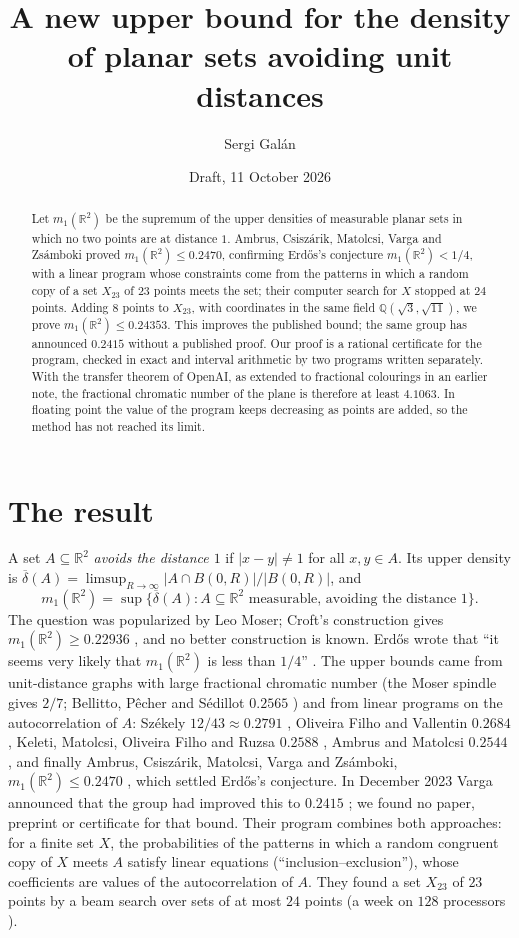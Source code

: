 \documentclass[11pt,a4paper]{amsart}
\title{A new upper bound for the density of planar sets avoiding unit distances}
\author{Sergi Gal\'an}
\date{Draft, 11 October 2026}
\theoremstyle{remark}
\newcommand{\Q}{\mathbb{Q}}
\newcommand{\R}{\mathbb{R}}
\newcommand{\NNEW}{8}
\newcommand{\MONE}{0.24353}
\newcommand{\INVM}{4.1063}
\begin{document}
\begin{abstract}
Let $m_1(\R^2)$ be the supremum of the upper densities of measurable planar sets in which no two points are at
distance $1$. Ambrus, Csisz\'arik, Matolcsi, Varga and Zs\'amboki proved $m_1(\R^2)\le0.2470$, confirming Erd\H{o}s's
conjecture $m_1(\R^2)<1/4$, with a linear program whose constraints come from the patterns in which a random copy of a
set $X_{23}$ of $23$ points meets the set; their computer search for $X$ stopped at $24$ points. Adding $\NNEW$ points
to $X_{23}$, with coordinates in the same field $\Q(\sqrt3,\sqrt{11})$, we prove $m_1(\R^2)\le\MONE$. This improves the published bound; the same group has announced $0.2415$ without a
published proof. Our proof is a rational certificate for the program, checked in exact and interval arithmetic by two
programs written separately.
With the transfer theorem of OpenAI, as extended to fractional colourings in an earlier note, the fractional chromatic
number of the plane is therefore at least $\INVM$. In floating point the value of the program keeps decreasing as points
are added, so the method has not reached its limit.
\end{abstract}

\maketitle

\section{The result}

A set $A\subseteq\R^2$ \emph{avoids the distance $1$} if $|x-y|\ne1$ for all $x,y\in A$. Its upper density is
$\overline\delta(A)=\limsup_{R\to\infty}|A\cap B(0,R)|/|B(0,R)|$, and
\[
m_1(\R^2)=\sup\{\overline\delta(A):A\subseteq\R^2\text{ measurable, avoiding the distance }1\}.
\]
The question was popularized by Leo Moser; Croft's construction gives $m_1(\R^2)\ge0.22936$ \cite{Croft}, and no better
construction is known. Erd\H{o}s wrote that ``it seems very likely that $m_1(\R^2)$ is less than $1/4$''
\cite{Erdos85}. The upper bounds came from unit-distance graphs with large fractional chromatic number (the Moser spindle
gives $2/7$; Bellitto, P\^echer and S\'edillot $0.2565$ \cite{BPS}) and from linear programs on the autocorrelation of
$A$: Sz\'ekely $12/43\approx0.2791$ \cite{Szekely}, Oliveira Filho and Vallentin $0.2684$ \cite{OFV}, Keleti, Matolcsi,
Oliveira Filho and Ruzsa $0.2588$ \cite{KMOR}, Ambrus and Matolcsi $0.2544$ \cite{AM}, and finally Ambrus,
Csisz\'arik, Matolcsi, Varga and Zs\'amboki, $m_1(\R^2)\le0.2470$ \cite{ACMVZ}, which settled Erd\H{o}s's conjecture.
In December 2023 Varga announced that the group had improved this to $0.2415$ \cite{Varga}; we found no paper, preprint
or certificate for that bound.
Their program combines both approaches: for a finite set $X$, the probabilities of the patterns in which a random
congruent copy of $X$ meets $A$ satisfy linear equations (``inclusion--exclusion''), whose coefficients are values of
the autocorrelation of $A$. They found a set $X_{23}$ of $23$ points by a beam search over sets of at most $24$ points
(a week on $128$ processors \cite[§9]{ACMVZ}).
\end{document}
